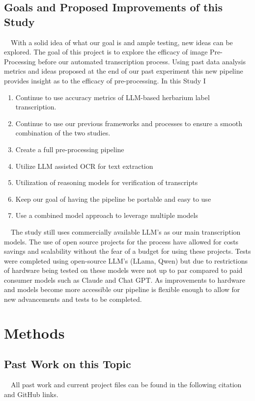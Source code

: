 \documentclass{article}
\begin{document}
\subsection{Goals and Proposed Improvements of this Study}
$\quad$With a solid idea of what our goal is and ample testing, new ideas can be explored. The goal of this project is to explore the efficacy of image Pre-Processing before our automated transcription process. Using past data analysis metrics and ideas proposed at the end of our past experiment this new pipeline provides insight as to the efficacy of pre-processing. In this Study I
\begin{enumerate}
\item Continue to use accuracy metrics of LLM-based herbarium label transcription. 
\item Continue to use our previous frameworks and processes to ensure a smooth combination of the two studies.
\item Create a full pre-processing pipeline
\item Utilize LLM assisted OCR for text extraction
\item Utilization of reasoning models for verification of transcripts
\item Keep our goal of having the pipeline be portable and easy to use
\item Use a combined model approach to leverage multiple models
\end{enumerate}
$\quad$The study still uses commercially available LLM's as our main transcription models. The use of open source projects for the process have allowed for costs savings and scalability without the fear of a budget for using these projects. Tests were completed using open-source LLM's (LLama, Qwen) but due to restrictions of hardware being tested on these models were not up to par compared to paid consumer models such as Claude and Chat GPT. As improvements to hardware and models become more accessible our pipeline is flexible enough to allow for new advancements and tests to be completed.  



\section{Methods}


\subsection{Past Work on this Topic}
$\quad$All past work and current project files can be found in the following citation and GitHub links. 
\end{document}
